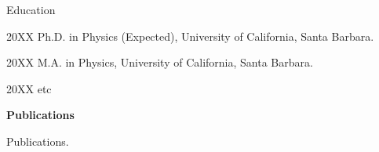 \begin{vitae}

\begin{vitaesection}{Education}
\vspace{-0.1cm}
\item [20XX]	Ph.D. in Physics (Expected), University of California, Santa Barbara.
\item [20XX]	M.A. in Physics, University of California, Santa Barbara.
\item [20XX]	etc
\end{vitaesection}

\textbf{Publications}

Publications.

\end{vitae}
